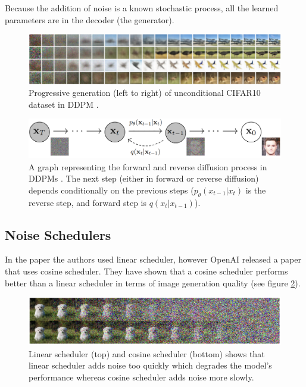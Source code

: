 Because the addition of noise is a known stochastic process, all the learned parameters are in the decoder (the generator).



\begin{figure}
    \centering
    \includegraphics[width=1\textwidth]{images/diffusion_models/ddpm_denoise.png}
    \caption{Progressive generation (left to right) of unconditional CIFAR10 dataset in DDPM \cite{ddpm}.}
\end{figure}


\begin{figure}
    \centering
    \includegraphics[width=1\textwidth]{images/diffusion_models/ddpm_process.png}
    \caption{A graph representing the forward and reverse diffusion process in DDPMs \cite{ddpm}. The next step (either in forward or reverse diffusion) depends conditionally on the previous steps ($p_\theta (x_{t-1} | x_t)$ is the reverse step, and forward step is $q(x_t | x_{t-1})$).}
    \label{fig:ddpm_process}
\end{figure}




\subsection{Noise Schedulers}

In the paper \cite{ddpm} the authors used linear scheduler, however OpenAI released a paper \cite{openai_improved_ddpm} that uses cosine scheduler. They have shown that a cosine scheduler performs better than a linear scheduler in terms of image generation quality (see figure \ref{fig:linear_cosine_scheduler}).

\begin{figure}
    \centering
    \includegraphics[width=1\textwidth]{images/diffusion_models/linear_cosine_scheduler.png}
    \caption{Linear scheduler (top) and cosine scheduler (bottom) shows that linear scheduler adds noise too quickly which degrades the model's performance whereas cosine scheduler adds noise more slowly.}
    \label{fig:linear_cosine_scheduler}
\end{figure}







